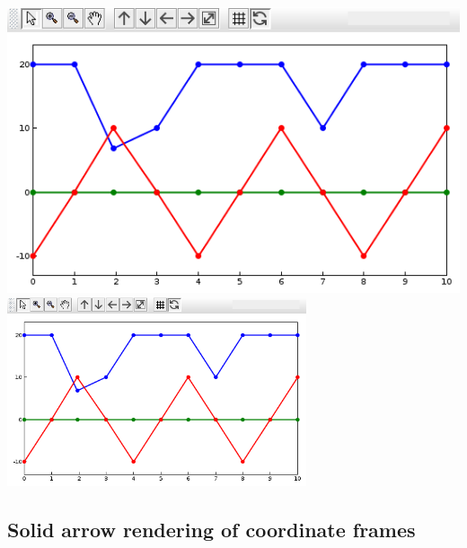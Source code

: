 \documentclass{article}
\begin{document}
\begin{center}
\iflatexml
\includegraphics[]{images/largeProbeDisplayNew}
\else
\includegraphics[width=0.66\textwidth]{images/largeProbeDisplayNew}
\fi
\end{center}
%

\subsection*{Solid arrow rendering of coordinate frames}
\end{document}
